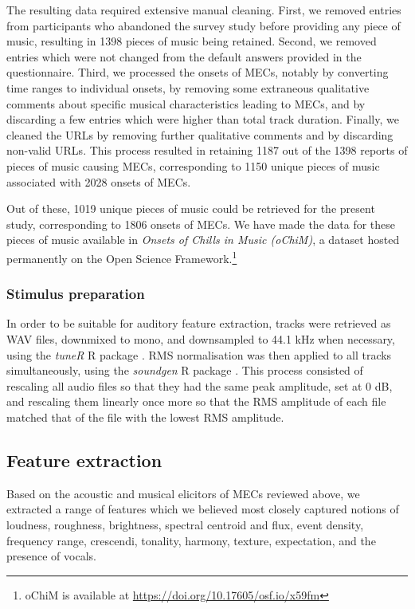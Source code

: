 The resulting data required extensive manual cleaning. First, we removed entries from participants who abandoned the survey study before providing any piece of music, resulting in 1398 pieces of music being retained. Second, we removed entries which were not changed from the default answers provided in the questionnaire. Third, we processed the onsets of MECs, notably by converting time ranges to individual onsets, by removing some extraneous qualitative comments about specific musical characteristics leading to MECs, and by discarding a few entries which were higher than total track duration. Finally, we cleaned the URLs by removing further qualitative comments and by discarding non-valid URLs. This process resulted in retaining 1187 out of the 1398 reports of pieces of music causing MECs, corresponding to 1150 unique pieces of music associated with 2028 onsets of MECs.

Out of these, 1019 unique pieces of music could be retrieved for the present study, corresponding to 1806 onsets of MECs. We have made the data for these pieces of music available in \emph{Onsets of Chills in Music (oChiM)}, a dataset hosted permanently on the Open Science Framework.\footnote{oChiM is available at \url{https://doi.org/10.17605/osf.io/x59fm}}

\subsubsection{Stimulus preparation}

In order to be suitable for auditory feature extraction, tracks were retrieved as WAV files, downmixed to mono, and downsampled to 44.1 kHz when necessary, using the \emph{tuneR} R package \parencite{ligges2018}. RMS normalisation was then applied to all tracks simultaneously, using the \emph{soundgen} R package \parencite{anikin2019}. This process consisted of rescaling all audio files so that they had the same peak amplitude, set at 0 dB, and rescaling them linearly once more so that the RMS amplitude of each file matched that of the file with the lowest RMS amplitude.

\subsection{Feature extraction}

Based on the acoustic and musical elicitors of MECs reviewed above, we extracted a range of features which we believed most closely captured notions of loudness, roughness, brightness, spectral centroid and flux, event density, frequency range, crescendi, tonality, harmony, texture, expectation, and the presence of vocals.


